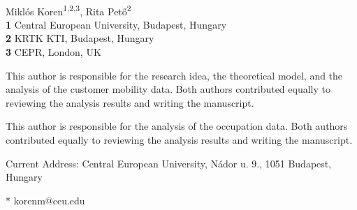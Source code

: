 \documentclass[10pt,letterpaper]{article}
\begin{document}
\vspace*{0.2in}

\begin{flushleft}
{\Large
\textbf{} %
}
\newline
\\
Miklós Koren\textsuperscript{1,2,3\Yinyang\textcurrency*},
Rita Pető\textsuperscript{2\ddag}
\\
\bigskip
\textbf{1} Central European University, Budapest, Hungary
\\
\textbf{2} KRTK KTI, Budapest, Hungary
\\
\textbf{3} CEPR, London, UK
\\
\bigskip

% 
%
\Yinyang This author is responsible for the research idea, the theoretical model, and the analysis of the customer mobility data. Both authors contributed equally to reviewing the analysis results and writing the manuscript. 

\ddag This author is responsible for the analysis of the occupation data. Both authors contributed equally to reviewing the analysis results and writing the manuscript.

\textcurrency Current Address: Central European University, Nádor u. 9., 1051 Budapest, Hungary %

* korenm@ceu.edu

\end{flushleft}
\end{document}
